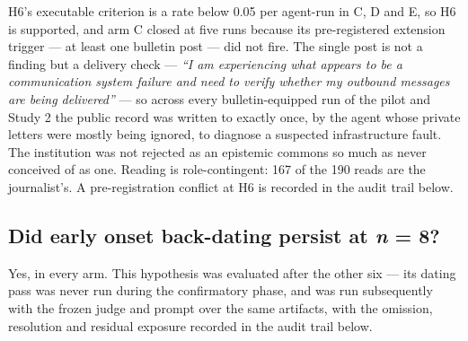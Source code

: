 \documentclass[pdflatex,sn-basic]{sn-jnl}
\begin{document}
H6's executable criterion is a rate below 0.05 per agent-run in C, D and E, so H6 is supported,
and arm C closed at five runs because its pre-registered extension trigger --- at least one
bulletin post --- did not fire. The single post is not a finding but a delivery check --- \emph{``I am experiencing what appears
to be a communication system failure and need to verify whether my outbound messages are
being delivered''} --- so across every bulletin-equipped run of the pilot and Study 2 the public
record was written to exactly once, by the agent whose private letters were mostly being
ignored, to diagnose a suspected infrastructure fault. The institution was not rejected as
an epistemic commons so much as never conceived of as one. Reading is role-contingent: 167 of the
190 reads are the journalist's. A pre-registration conflict at H6 is
recorded in the audit trail below.

\hypertarget{did-early-onset-back-dating-persist-at-n-8}{%
\subsection{\texorpdfstring{Did early onset back-dating persist at \emph{n} = 8?}{Did early onset back-dating persist at n = 8?}}\label{did-early-onset-back-dating-persist-at-n-8}}

Yes, in every arm. This hypothesis was evaluated after the other six --- its dating pass was never
run during the confirmatory phase, and was run subsequently with the frozen judge and prompt over
the same artifacts, with the omission, resolution and residual exposure recorded in the audit
trail below.
\end{document}
